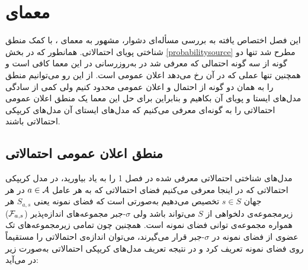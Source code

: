 \chapter{معمای \texorpdfstring{ }{\textsc{Monty Hall}}}
این فصل اختصاص یافته به بررسی مسأله‌ای دشوار، مشهور به معمای ، با کمک منطق شناختی پویای احتمالاتی. همانطور که در بخش \ref{probabilitysource} مطرح شد تنها دو گونه از سه گونه احتمالی که معرفی شد در به‌روزرسانی در این معما کافی است و همچنین تنها عملی که در آن رخ می‌دهد اعلان عمومی است. از این رو می‌توانیم منطق را به همان دو گونه از احتمال و اعلان عمومی محدود کنیم ولی کمی از سادگی مدل‌های ایستا و پویای آن بکاهیم و بنابراین برای حل این معما یک منطق اعلان عمومی احتمالاتی را به گونه‌ای معرفی می‌کنیم که مدل‌های ایستای آن مدل‌های کریپکی احتمالاتی باشند.
\section{منطق اعلان عمومی احتمالاتی \texorpdfstring{ }{(PPAL)}}
مدل‌های شناختی احتمالاتی معرفی شده در فصل 1 را به یاد بیاورید، در مدل کریپکی احتمالاتی که در اینجا معرفی می‌کنیم فضای احتمالاتی که به هر عامل $ a\in\mathcal{A} $ در هر جهان $ s\in S $ تخصیص می‌دهیم به‌صورتی است که فضای نمونه‌ یعنی $ S_{a,s} $ هر زیرمجموعه‌ی دلخواهی از $ S $ می‌تواند باشد ولی $ \sigma $-جبر مجموعه‌های اندازه‌پذیر ($ \mathcal{F}_{a,s} $) همواره مجموعه‌ی توانی فضای نمونه است. همچنین چون تمامی زیرمجموعه‌های تک عضوی از فضای نمونه در $ \sigma $-جبر قرار می‌گیرند، می‌توان اندازه‌ی احتمالاتی را مستقیماً روی فضای نمونه تعریف کرد و در نتیجه تعریف مدل‌های کریپکی احتمالاتی به‌صورت زیر در می‌آید:

